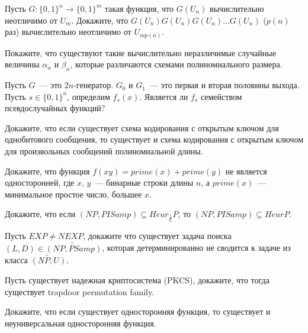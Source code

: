 \setcounter{curtask}{26}


\begin{task}
    Пусть $G: \{0, 1\}^{n} \rightarrow \{0, 1\}^{m}$ такая функция, что $G(U_n)$
    вычислительно неотличимо от $U_m$. Докажите, что $G(U_n)G(U_n)G(U_n) \dots
    G(U_n)$ ($p(n)$ раз) вычислительно неотличимо от $U_{m p(n)}$.
\end{task}

\begin{task}
    Покажите, что существуют такие вычислительно неразличимые случайные величины
    $\alpha_n$ и $\beta_n$, которые различаются схемами полиномиального размера.
\end{task}

\begin{task}
    Пусть $G$~--- это $2n$-генератор. $G_0$ и $G_1$~--- это первая и вторая половины
    выхода. Пусть $s \in \{0, 1\}^n$, определим $f_s(x)$. Является ли $f_s$
    семейством псевдослучайных функций?
\end{task}

\begin{task}
    Докажите, что если существует схема кодирования с открытым ключом для
    однобитового сообщения, то существует и схема кодирования с открытым ключом для
    произвольных сообщений полиномиальной длины.
\end{task}

\breakline

\begin{ptask}{12}
    Докажите, что функция $f(xy) = prime(x) + prime(y)$ не является односторонней,
    где $x$, $y$~--- бинарные строки длины $n$, а $prime(x)$~--- минимальное простое
    число, большее $x$.
\end{ptask}

\begin{ptask}{21}
    Докажите, что если $(NP, PISamp) \subseteq Heur_{\frac{1}{n}}P$, то $(NP, PISamp)
    \subseteq HeurP$.
\end{ptask}

\begin{ptask}{22}
    Пусть $EXP \neq NEXP$, докажите что существует задача поиска $(L, D) \in
    \widetilde{(NP, PSamp)}$,
    которая детерминированно не сводится к задаче из класса $\widetilde{(NP, U)}$.
\end{ptask}

\begin{ptask}{27}
    Пусть существует надежная криптосистема (PKCS), докажите, что тогда существует
    trapdoor permutation family.
\end{ptask}

\begin{ptask}{28}
    Докажите, что если существует односторонняя функция, то существует и
    неуниверсальная односторонняя функция.
\end{ptask}
